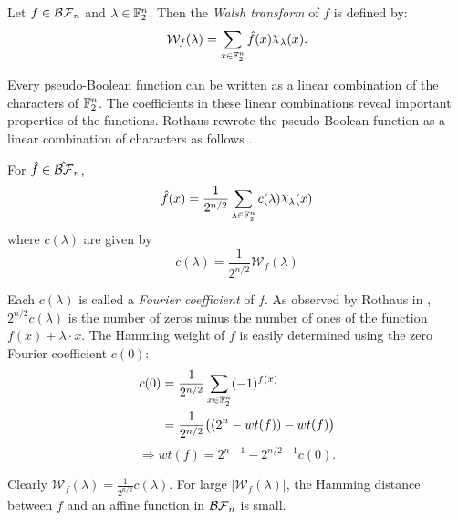 \begin{definition}\label{def:walsh}
  Let $f\in\mathcal{BF}_n$ and $\lambda\in\mathbb{F}_2^n$. Then the {\em Walsh transform}
  of $f$ is defined by:
  \begin{equation}\label{eqn:walsh}
    \mathcal{W}_f(\lambda)=\sum_{x\in\gftwo^n}\hat{f}(x)\Chi_\lambda(x).
  \end{equation}
\end{definition}

\par Every pseudo-Boolean function can be written as a linear combination of
the characters of $\mathbb{F}_2^n$. The coefficients in these linear combinations
reveal important properties of the functions. Rothaus rewrote the
pseudo-Boolean function as a linear combination of characters
as follows \cite{art:r76}. 

\begin{lemma}
  For $\hat{f}\in\hat{\mathcal{BF}}_n$,
\begin{equation}\label{eqn:rewrite-pseudo}
	\hat{f}(x)
    =\frac{1}{2^{n/2}}
      \sum_{\lambda\in\gftwo^n}c(\lambda)\Chi_\lambda(x)
\end{equation}
	where $c(\lambda)$ are given by
  \begin{equation}\label{eqn:clambda}
    c(\lambda)=\frac{1}{2^{n/2}}\mathcal{W}_f(\lambda)
  \end{equation}
\end{lemma}

\par Each $c(\lambda)$ is called a \textit{Fourier coefficient} of $f$.
As observed by Rothaus in \cite{art:r76}, $2^{n/2}c(\lambda)$ is the
number of zeros minus the number of ones of the function
$f(x)+\lambda\cdot x$. The Hamming weight of $f$ is easily determined using
the zero Fourier coefficient $c(0)$:
\begin{align*}
	c(0)&=\frac{1}{2^{n/2}}\sum_{x\in\mathbb{F}_2^n}(-1)^{f(x)}\\
	&=\frac{1}{2^{n/2}}\big((2^n-wt(f))-wt(f)\big)
\end{align*}
\begin{equation}
  \Rightarrow wt(f)=2^{n-1}-2^{n/2-1}c(0).
\end{equation}

\par Clearly $\mathcal{W}_f(\lambda)=\frac{1}{2^{n/2}}c(\lambda)$. For large
$|\mathcal{W}_f(\lambda)|$, the Hamming distance between $f$ and an affine
function in $\mathcal{BF}_n$ is small.


